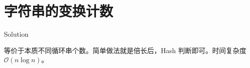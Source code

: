\section{字符串的变换计数}

\begin{frame}{Solution}

等价于本质不同循环串个数。简单做法就是倍长后，Hash 判断即可。时间复杂度 $\mathcal O(n\log n)$。

\end{frame}